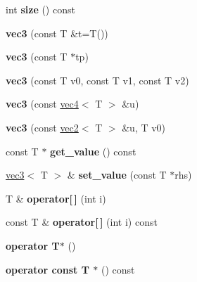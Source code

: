 \begin{DoxyCompactItemize}
\item 
\hypertarget{classnv_1_1vec3_a966fc26f307c02636986089fda954590}{}\label{classnv_1_1vec3_a966fc26f307c02636986089fda954590} 
int {\bfseries size} () const
\item 
\hypertarget{classnv_1_1vec3_a9af8f0a565b0a72e2de05828dc8fd136}{}\label{classnv_1_1vec3_a9af8f0a565b0a72e2de05828dc8fd136} 
{\bfseries vec3} (const T \&t=T())
\item 
\hypertarget{classnv_1_1vec3_a1185f99bce68e1e55ff562614670540b}{}\label{classnv_1_1vec3_a1185f99bce68e1e55ff562614670540b} 
{\bfseries vec3} (const T $\ast$tp)
\item 
\hypertarget{classnv_1_1vec3_a00cd5e741e65a508fe47e646ccdd18de}{}\label{classnv_1_1vec3_a00cd5e741e65a508fe47e646ccdd18de} 
{\bfseries vec3} (const T v0, const T v1, const T v2)
\item 
\hypertarget{classnv_1_1vec3_acb8594a208cc19189a10d144b9188e7b}{}\label{classnv_1_1vec3_acb8594a208cc19189a10d144b9188e7b} 
{\bfseries vec3} (const \hyperlink{classnv_1_1vec4}{vec4}$<$ T $>$ \&u)
\item 
\hypertarget{classnv_1_1vec3_ab3f0294e4bb187d4a1d1ca0d56a859b4}{}\label{classnv_1_1vec3_ab3f0294e4bb187d4a1d1ca0d56a859b4} 
{\bfseries vec3} (const \hyperlink{classnv_1_1vec2}{vec2}$<$ T $>$ \&u, T v0)
\item 
\hypertarget{classnv_1_1vec3_aba00d285a41f4c5482de15097a521755}{}\label{classnv_1_1vec3_aba00d285a41f4c5482de15097a521755} 
const T $\ast$ {\bfseries get\+\_\+value} () const
\item 
\hypertarget{classnv_1_1vec3_a5f83b5b9c0cf8ee096e8a962cb6ed7f7}{}\label{classnv_1_1vec3_a5f83b5b9c0cf8ee096e8a962cb6ed7f7} 
\hyperlink{classnv_1_1vec3}{vec3}$<$ T $>$ \& {\bfseries set\+\_\+value} (const T $\ast$rhs)
\item 
\hypertarget{classnv_1_1vec3_a72dfa9cf18fef05de845fb4283b2fa04}{}\label{classnv_1_1vec3_a72dfa9cf18fef05de845fb4283b2fa04} 
T \& {\bfseries operator\mbox{[}$\,$\mbox{]}} (int i)
\item 
\hypertarget{classnv_1_1vec3_a86c51e55381a176e76b5e9a36793a52c}{}\label{classnv_1_1vec3_a86c51e55381a176e76b5e9a36793a52c} 
const T \& {\bfseries operator\mbox{[}$\,$\mbox{]}} (int i) const
\item 
\hypertarget{classnv_1_1vec3_ab19d1b3b43bf074d5d9899cc1203578c}{}\label{classnv_1_1vec3_ab19d1b3b43bf074d5d9899cc1203578c} 
{\bfseries operator T$\ast$} ()
\item 
\hypertarget{classnv_1_1vec3_a6c0afd115942cef09b28130dd7d528ba}{}\label{classnv_1_1vec3_a6c0afd115942cef09b28130dd7d528ba} 
{\bfseries operator const T $\ast$} () const
\end{DoxyCompactItemize}
